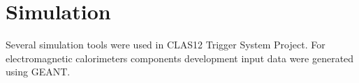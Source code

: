 \section{Simulation}

Several simulation tools were used in CLAS12 Trigger System Project. For electromagnetic calorimeters components development input data were generated using GEANT.

